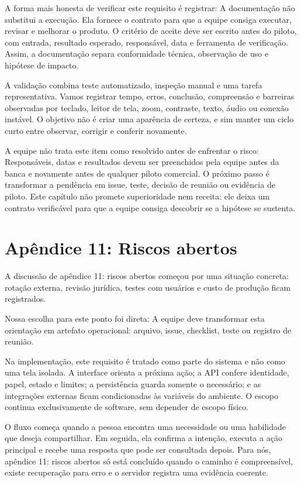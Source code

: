 \documentclass[12pt,oneside,a4paper,article]{abntex2}
\begin{document}
A forma mais honesta de verificar este requisito é registrar: A documentação não substitui a execução. Ela fornece o contrato para que a equipe consiga executar, revisar e melhorar o produto. O critério de aceite deve ser escrito antes do piloto, com entrada, resultado esperado, responsável, data e ferramenta de verificação. Assim, a documentação separa conformidade técnica, observação de uso e hipótese de impacto.

A validação combina teste automatizado, inspeção manual e uma tarefa representativa. Vamos registrar tempo, erros, conclusão, compreensão e barreiras observadas por teclado, leitor de tela, zoom, contraste, texto, áudio ou conexão instável. O objetivo não é criar uma aparência de certeza, e sim manter um ciclo curto entre observar, corrigir e conferir novamente.

A equipe não trata este item como resolvido antes de enfrentar o risco: Responsáveis, datas e resultados devem ser preenchidos pela equipe antes da banca e novamente antes de qualquer piloto comercial. O próximo passo é transformar a pendência em issue, teste, decisão de reunião ou evidência de piloto. Este capítulo não promete superioridade nem receita: ele deixa um contrato verificável para que a equipe consiga descobrir se a hipótese se sustenta.

\section{Apêndice 11: Riscos abertos}
A discussão de apêndice 11: riscos abertos começou por uma situação concreta: rotação externa, revisão jurídica, testes com usuários e custo de produção ficam registrados.

Nossa escolha para este ponto foi direta: A equipe deve transformar esta orientação em artefato operacional: arquivo, issue, checklist, teste ou registro de reunião.

Na implementação, este requisito é tratado como parte do sistema e não como uma tela isolada. A interface orienta a próxima ação; a API confere identidade, papel, estado e limites; a persistência guarda somente o necessário; e as integrações externas ficam condicionadas às variáveis do ambiente. O escopo continua exclusivamente de software, sem depender de escopo físico.

O fluxo começa quando a pessoa encontra uma necessidade ou uma habilidade que deseja compartilhar. Em seguida, ela confirma a intenção, executa a ação principal e recebe uma resposta que pode ser consultada depois. Para nós, apêndice 11: riscos abertos só está concluído quando o caminho é compreensível, existe recuperação para erro e o servidor registra uma evidência coerente.
\end{document}
